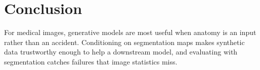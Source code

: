 \chapter{Conclusion}
\label{ch:conclusion}

For medical images, generative models are most useful when anatomy is an input rather than an
accident. Conditioning on segmentation maps makes synthetic data trustworthy enough to help a
downstream model, and evaluating with segmentation catches failures that image statistics miss.
